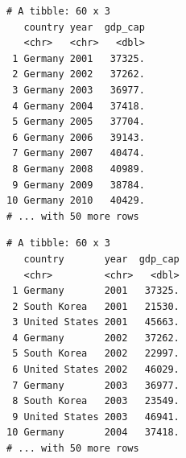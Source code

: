 \documentclass[
  11pt,
]{krantz}
\newenvironment{Shaded}{\begin{snugshade}}{\end{snugshade}}
\newcommand{\CommentTok}[1]{\textcolor[rgb]{0.37,0.37,0.37}{\textit{#1}}}
\newcommand{\DataTypeTok}[1]{\textcolor[rgb]{0.27,0.27,0.27}{#1}}
\newcommand{\DecValTok}[1]{\textcolor[rgb]{0.06,0.06,0.06}{#1}}
\newcommand{\KeywordTok}[1]{\textcolor[rgb]{0.27,0.27,0.27}{\textbf{#1}}}
\newcommand{\NormalTok}[1]{#1}
\newcommand{\OperatorTok}[1]{\textcolor[rgb]{0.43,0.43,0.43}{\textbf{#1}}}
\newcommand{\StringTok}[1]{\textcolor[rgb]{0.5,0.5,0.5}{#1}}
\begin{document}
\begin{Shaded}
\end{Shaded}

\begin{verbatim}
# A tibble: 60 x 3
   country year  gdp_cap
   <chr>   <chr>   <dbl>
 1 Germany 2001   37325.
 2 Germany 2002   37262.
 3 Germany 2003   36977.
 4 Germany 2004   37418.
 5 Germany 2005   37704.
 6 Germany 2006   39143.
 7 Germany 2007   40474.
 8 Germany 2008   40989.
 9 Germany 2009   38784.
10 Germany 2010   40429.
# ... with 50 more rows
\end{verbatim}

\begin{Shaded}
\end{Shaded}

\begin{verbatim}
# A tibble: 60 x 3
   country       year  gdp_cap
   <chr>         <chr>   <dbl>
 1 Germany       2001   37325.
 2 South Korea   2001   21530.
 3 United States 2001   45663.
 4 Germany       2002   37262.
 5 South Korea   2002   22997.
 6 United States 2002   46029.
 7 Germany       2003   36977.
 8 South Korea   2003   23549.
 9 United States 2003   46941.
10 Germany       2004   37418.
# ... with 50 more rows
\end{verbatim}

\normalsize
\end{document}
